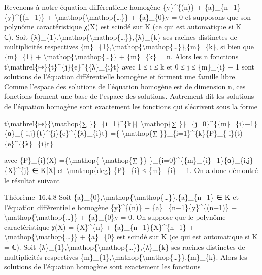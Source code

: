 \documentclass[]{article}
\begin{document}
Revenons à notre équation différentielle homogène \{y\}\^{}\{(n)\} +
\{a\}\_\{n−1\}\{y\}\^{}\{(n−1)\} +
\textbackslash{}mathop\{\textbackslash{}mathop\{\ldots{}\}\} +
\{a\}\_\{0\}y = 0 et supposons que son polynôme caractéristique χ(X) est
scindé sur K (ce qui est automatique si K = ℂ). Soit
\{λ\}\_\{1\},\textbackslash{}mathop\{\textbackslash{}mathop\{\ldots{}\}\},\{λ\}\_\{k\}
ses racines distinctes de multiplicités respectives
\{m\}\_\{1\},\textbackslash{}mathop\{\textbackslash{}mathop\{\ldots{}\}\},\{m\}\_\{k\},
si bien que \{m\}\_\{1\} +
\textbackslash{}mathop\{\textbackslash{}mathop\{\ldots{}\}\} +
\{m\}\_\{k\} = n. Alors les n fonctions
t\textbackslash{}mathrel\{↦\}\{t\}\^{}\{j\}\{e\}\^{}\{\{λ\}\_\{i\}t\}
avec 1 ≤ i ≤ k et 0 ≤ j ≤ \{m\}\_\{i\} − 1 sont solutions de l'équation
différentielle homogène et forment une famille libre. Comme l'espace des
solutions de l'équation homogène est de dimension n, ces fonctions
forment une base de l'espace des solutions. Autrement dit les solutions
de l'équation homogène sont exactement les fonctions qui s'écrivent sous
la forme

t\textbackslash{}mathrel\{↦\}\{\textbackslash{}mathop\{∑
\}\}\_\{i=1\}\^{}\{k\}\{ \textbackslash{}mathop\{∑
\}\}\_\{j=0\}\^{}\{\{m\}\_\{i\}−1\}\{α\}\_\{
i,j\}\{t\}\^{}\{j\}\{e\}\^{}\{\{λ\}\_\{i\}t\} =\{
\textbackslash{}mathop\{∑ \}\}\_\{i=1\}\^{}\{k\}\{P\}\_\{
i\}(t)\{e\}\^{}\{\{λ\}\_\{i\}t\}

avec \{P\}\_\{i\}(X) =\{\textbackslash{}mathop\{
\textbackslash{}mathop\{∑ \}\}
\}\_\{i=0\}\^{}\{\{m\}\_\{i\}−1\}\{α\}\_\{i,j\}\{X\}\^{}\{j\} ∈ K{[}X{]}
et \textbackslash{}mathop\{deg\} \{P\}\_\{i\} ≤ \{m\}\_\{i\} − 1. On a
donc démontré le résultat suivant

Théorème~16.4.8 Soit
\{a\}\_\{0\},\textbackslash{}mathop\{\textbackslash{}mathop\{\ldots{}\}\},\{a\}\_\{n−1\}
∈ K et l'équation différentielle homogène \{y\}\^{}\{(n)\} +
\{a\}\_\{n−1\}\{y\}\^{}\{(n−1)\} +
\textbackslash{}mathop\{\textbackslash{}mathop\{\ldots{}\}\} +
\{a\}\_\{0\}y = 0. On suppose que le polynôme caractéristique χ(X) =
\{X\}\^{}\{n\} + \{a\}\_\{n−1\}\{X\}\^{}\{n−1\} +
\textbackslash{}mathop\{\textbackslash{}mathop\{\ldots{}\}\} +
\{a\}\_\{0\} est scindé sur K (ce qui est automatique si K = ℂ). Soit
\{λ\}\_\{1\},\textbackslash{}mathop\{\textbackslash{}mathop\{\ldots{}\}\},\{λ\}\_\{k\}
ses racines distinctes de multiplicités respectives
\{m\}\_\{1\},\textbackslash{}mathop\{\textbackslash{}mathop\{\ldots{}\}\},\{m\}\_\{k\}.
Alors les solutions de l'équation homogène sont exactement les fonctions
\end{document}
